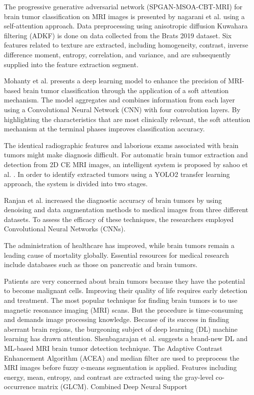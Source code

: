 \documentclass[twocolumn]{article}
\begin{document}
     The progressive generative adversarial network (SPGAN-MSOA-CBT-MRI) for brain tumor classification on MRI images is presented by nagarani et al. \cite{nagarani2024self} using a self-attention approach. Data preprocessing using anisotropic diffusion Kuwahara filtering (ADKF) is done on data collected from the Brats 2019 dataset. Six features related to texture are extracted, including homogeneity, contrast, inverse difference moment, entropy, correlation, and variance, and are subsequently supplied into the feature extraction segment.
    
     Mohanty et al. \cite{mohanty2024feature} presents a deep learning model to enhance the precision of MRI-based brain tumor classification through the application of a soft attention mechanism. The model aggregates and combines information from each layer using a Convolutional Neural Network (CNN) with four convolution layers. By highlighting the characteristics that are most clinically relevant, the soft attention mechanism at the terminal phases improves classification accuracy.
        
     The identical radiographic features and laborious exams associated with brain tumors might make diagnosis difficult. For automatic brain tumor extraction and detection from 2D CE MRI images, an intelligent system is proposed by sahoo et al. \cite{sahoo2023efficient}. In order to identify extracted tumors using a YOLO2 transfer learning approach, the system is divided into two stages.
        
     Ranjan et al. \cite{ranjbarzadeh2021brain} increased the diagnostic accuracy of brain tumors by using denoising and data augmentation methods to medical images from three different datasets. To assess the efficacy of these techniques, the researchers employed Convolutional Neural Networks (CNNs).
        
     \cite{khan2024brain}The administration of healthcare has improved, while brain tumors remain a leading cause of mortality globally. Essential resources for medical research include databases such as those on pancreatic and brain tumors.

     Patients are very concerned about brain tumors because they have the potential to become malignant cells. Improving their quality of life requires early detection and treatment. The most popular technique for finding brain tumors is to use magnetic resonance imaging (MRI) scans. But the procedure is time-consuming and demands image processing knowledge. Because of its success in finding aberrant brain regions, the burgeoning subject of deep learning (DL) machine learning has drawn attention. Shenbagarajan et al. \cite{anantharajan2024mri} suggests a brand-new DL and ML-based MRI brain tumor detection technique. The Adaptive Contrast Enhancement Algorithm (ACEA) and median filter are used to preprocess the MRI images before fuzzy c-means segmentation is applied. Features including energy, mean, entropy, and contrast are extracted using the gray-level co-occurrence matrix (GLCM). Combined Deep Neural Support
\end{document}
